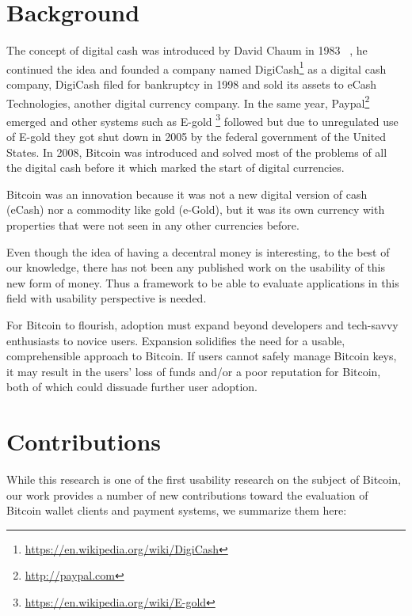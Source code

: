 \section{Background}
The concept of digital cash was introduced by David Chaum in 1983 ~\cite{chaum1983blind}, he continued the idea and founded a company named DigiCash\footnote{\url{https://en.wikipedia.org/wiki/DigiCash}} as a digital cash company, DigiCash filed for bankruptcy in 1998 and sold its assets to eCash Technologies, another digital currency company. In the same year, Paypal\footnote{\url{http://paypal.com}} emerged and other systems such as E-gold \footnote{\url{https://en.wikipedia.org/wiki/E-gold}} followed but due to unregulated use of E-gold they got shut down in 2005 by the federal government of the United States. In 2008, Bitcoin was introduced and solved most of the problems of all the digital cash before it which marked the start of digital currencies.

Bitcoin was an innovation because it was not a new digital version of cash (eCash) nor a commodity like gold (e-Gold), but it was its own currency with properties that were not seen in any other currencies before.

Even though the idea of having a decentral money is interesting, to the best of our knowledge, there has not been any published work on the usability of this new form of money. Thus a framework to be able to evaluate applications in this field with usability perspective is needed.

For Bitcoin to flourish, adoption must expand beyond developers and tech-savvy enthusiasts to novice users. Expansion solidifies the need for a usable, comprehensible approach to Bitcoin. If users cannot safely manage Bitcoin keys, it may result in the users' loss of funds and/or a poor reputation for Bitcoin, both of which could dissuade further user adoption. 






\section{Contributions}
While this research is one of the first usability research on the subject of Bitcoin, our work provides a number of new contributions toward the evaluation of Bitcoin wallet clients and payment systems, we summarize them here:

